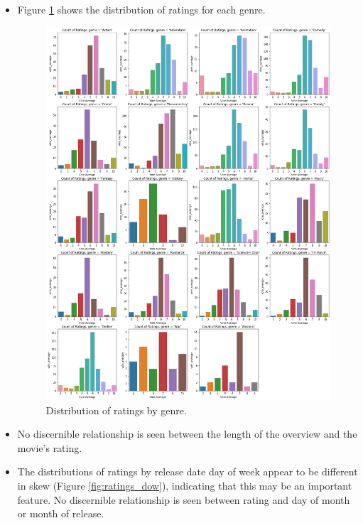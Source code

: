 \documentclass[12pt, oneside]{article}   	%
\begin{document}
\begin{itemize}
\item Figure \ref{fig:ratings_by_genre} shows the distribution of ratings for each genre.

\begin{figure}
\includegraphics[height=0.9\textheight]{ratings_by_genre}
\caption{\label{fig:ratings_by_genre}Distribution of ratings by genre.}
\end{figure}

\item No discernible relationship is seen between the length of the overview and the movie's rating.

\item The distributions of ratings by release date day of week appear to be different in skew (Figure \ref{fig:ratings_dow}), indicating that this may be an important feature. No discernible relationship is seen between rating and day of month or month of release.


\end{itemize}
\end{document}
